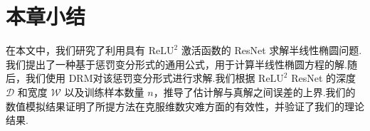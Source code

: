 \section{本章小结}\label{sec:dis}
在本文中，我们研究了利用具有 $\mathrm{ReLU}^2$ 激活函数的 ResNet 求解半线性椭圆问题.我们提出了一种基于惩罚变分形式的通用公式，用于计算半线性椭圆方程的解.随后，我们使用 DRM对该惩罚变分形式进行求解.我们根据 $\mathrm{ReLU}^2$ ResNet 的深度 $\mathcal{D}$ 和宽度 $\mathcal{W}$ 以及训练样本数量 $n$，推导了估计解与真解之间误差的上界.我们的数值模拟结果证明了所提方法在克服维数灾难方面的有效性，并验证了我们的理论结果.



